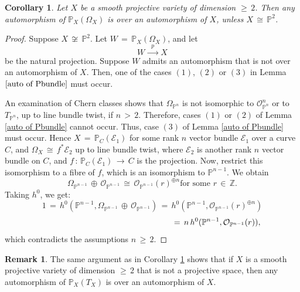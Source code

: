 \documentclass[12pt,reqno]{amsart}
\newcommand{\p}{\mathbb{P}_{C}}
\newtheorem{corollary}[lemma]{Corollary}
\theoremstyle{definition}
\newtheorem{remark}[lemma]{Remark}
\numberwithin{equation}{section}
\begin{document}
\begin{corollary}\label{Pomega}
Let $X$ be a smooth projective variety of dimension $\geq\, 2$. Then any automorphism of $\mathbb{P}_{X}(\Omega_{X})$ is over an automorphism of $X$, unless $X\, \cong\, \mathbb{P}^{2}$.
\end{corollary}
\begin{proof}
Suppose $X \,\not\cong\, \mathbb{P}^{2}$. Let $W \,=\, \mathbb{P}_{X}(\Omega_{X})$, and let
$$W\,\xrightarrow{\,\,\, p\,\,\,}\, X$$ be the natural projection. Suppose $W$ admits an automorphism that is not over an automorphism of $X$. Then, one of the cases $(1)$, $(2)$ or $(3)$ in Lemma $\ref{auto of Pbundle}$ must occur.


An examination of Chern classes shows that $\Omega_{\mathbb{P}^{n}}$ is not isomorphic to $\mathcal{O}_{\mathbb{P}^{n}}^{n}$ or to $T_{\mathbb{P}^{n}}$, up to line bundle twist, if $n\,>\,2$. Therefore, cases $(1)$ or $(2)$ of Lemma \ref{auto of Pbundle} cannot occur. Thus, case $(3)$ of Lemma \ref{auto of Pbundle} must occur. Hence $X \,=\, \p(\mathcal{E}_{1})$ for some rank $n$ vector bundle $\mathcal{E}_{1}$ over a curve $C$, and $\Omega_{X} \,\cong\, f^{\ast}\mathcal{E}_{2}$ up to line bundle twist, where $\mathcal{E}_{2}$ is another rank $n$ vector bundle on $C$, and $f\,:\,\p(\mathcal{E}_{1})\,\longrightarrow\, C$ is the projection. Now, restrict this isomorphism to a fibre of $f$, which is an isomorphism to $\mathbb{P}^{n-1}$. We obtain
 \begin{equation*}
\Omega_{\mathbb{P}^{n-1}}\,\oplus\,\mathcal{O}_{\mathbb{P}^{n-1}}\,\cong\, \mathcal{O}_{\mathbb{P}^{n-1}}(r)^{\oplus n}
\textrm{for some}\,\, r\,\in\, \mathbb{Z}.
\end{equation*}
Taking $h^{0}$, we get:
\begin{equation*}
1\, =\, h^{0}(\mathbb{P}^{n-1}, \Omega_{\mathbb{P}^{n-1}}\,\oplus\, \mathcal{O}_{\mathbb{P}^{n-1}}) \, =\, h^{0}(\mathbb{P}^{n-1}, \mathcal{O}_{\mathbb{P}^{n-1}}(r)^{\oplus n})   
\end{equation*}
\begin{equation*}
\hspace{5.6cm} =\, n \,h^{0}(\mathbb{P}^{n-1}, \mathcal{O}_{\mathbb{P}^{n-1}}(r)),  
\end{equation*}
which contradicts the assumptions $n\,\geq\, 2$.
\end{proof}
\begin{remark}
The same argument as in Corollary \ref{Pomega} shows that if $X$ is a smooth projective variety of dimension $\geq\, 2$ that is not a projective space, then any automorphism of $\mathbb{P}_{X}(T_{X})$ is over an automorphism of $X$.
\end{remark}
\end{document}
